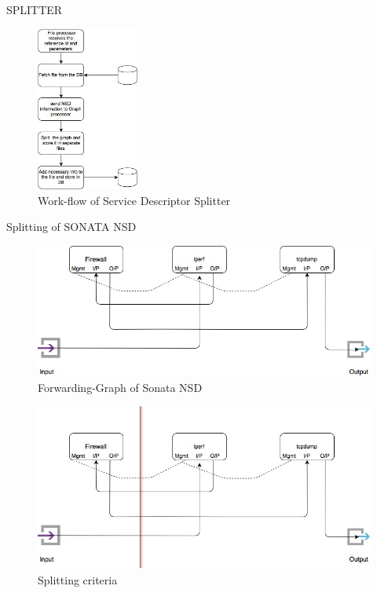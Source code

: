 \begin{frame}
\Huge{\centerline{SPLITTER}}
\end{frame}




\begin{frame}	
\begin{figure} [!]
	\centering
	\includegraphics[width=0.3\textwidth]{images/img-1-split}
	\caption{Work-flow of Service Descriptor Splitter}
\end{figure}
\end{frame}

\begin{frame}
\Huge{\centerline{Splitting of SONATA NSD}}
\end{frame}



\begin{frame}
\begin{figure}
	\centering 
	\includegraphics[width=0.5\linewidth]{images/img-2-split}
	\\Forwarding-Graph of Sonata NSD
\end{figure}

\begin{figure}
	\centering 
	\includegraphics[width=0.5\linewidth]{images/img-3-split}
	\\Splitting criteria
\end{figure}
\end{frame}


